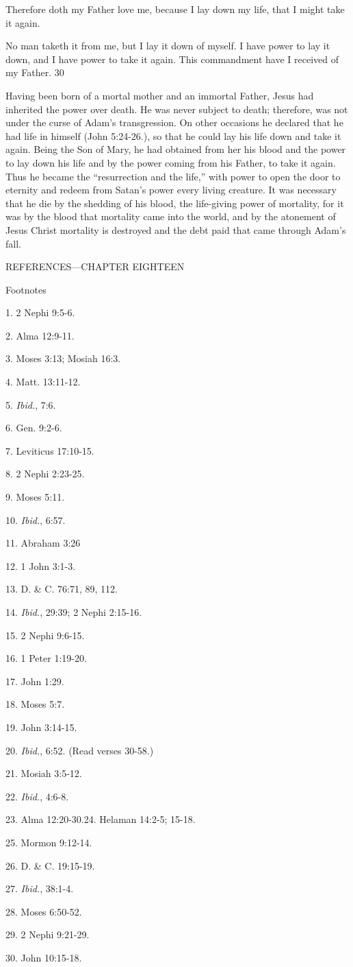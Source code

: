 Therefore doth my Father love me, because I lay down my life, that I might take it again.

No man taketh it from me, but I lay it down of myself. I have power to lay it down, and I
have power to take it again. This commandment have I received of my Father. 30

Having been born of a mortal mother and an immortal Father, Jesus had inherited the power
over death. He was never subject to death; therefore, was not under the curse of Adam's
transgression. On other occasions he declared that he had life in himself (John 5:24-26.), so
that he could lay his life down and take it again. Being the Son of Mary, he had obtained
from her his blood and the power to lay down his life and by the power coming from his
Father, to take it again. Thus he became the ``resurrection and the life,'' with power to open
the door to eternity and redeem from Satan's power every living creature. It was necessary
that he die by the shedding of his blood, the life-giving power of mortality, for it was by the
blood that mortality came into the world, and by the atonement of Jesus Christ mortality is
destroyed and the debt paid that came through Adam's fall.

\newpage
REFERENCES—CHAPTER EIGHTEEN

Footnotes

1. 2 Nephi 9:5-6.

2. Alma 12:9-11.

3. Moses 3:13; Mosiah 16:3.

4. Matt. 13:11-12.

5. \textit{Ibid.}, 7:6.

6. Gen. 9:2-6.

7. Leviticus 17:10-15.

8. 2 Nephi 2:23-25.

9. Moses 5:11.

10. \textit{Ibid.}, 6:57.

11. Abraham 3:26

12. 1 John 3:1-3.

13. D. \& C. 76:71, 89, 112.

14. \textit{Ibid.}, 29:39; 2 Nephi 2:15-16.

15. 2 Nephi 9:6-15.

16. 1 Peter 1:19-20.

17. John 1:29.

18. Moses 5:7.

19. John 3:14-15.

20. \textit{Ibid.}, 6:52. (Read verses 30-58.)

21. Mosiah 3:5-12.

22. \textit{Ibid.}, 4:6-8.

23. Alma 12:20-30.24. Helaman 14:2-5; 15-18.

25. Mormon 9:12-14.

26. D. \& C. 19:15-19.

27. \textit{Ibid.}, 38:1-4.

28. Moses 6:50-52.

29. 2 Nephi 9:21-29.

30. John 10:15-18.

